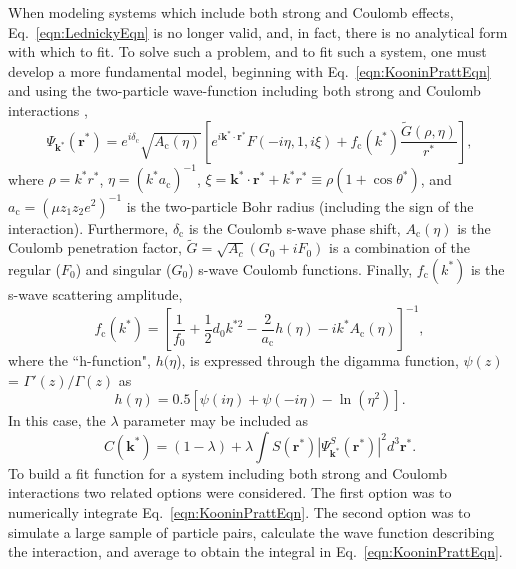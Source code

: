\documentclass[ALICE,manyauthors]{cernphprep}
\begin{document}
When modeling systems which include both strong and Coulomb effects, Eq.\ \ref{eqn:LednickyEqn} is no longer valid, and, in fact, there is no analytical form with which to fit.
To solve such a problem, and to fit such a system, one must develop a more fundamental model, beginning with Eq.\ \ref{eqn:KooninPrattEqn} and using the two-particle wave-function including both strong and Coulomb interactions \cite{Lednicky:2005tb},
\begin{equation}
 \Psi_{\mathbf{k^{*}}}(\mathbf{r^{*}}) = e^{i\delta_{\mathrm{c}}}\sqrt{A_{\mathrm{c}}(\eta)}[e^{i\mathbf{k^{*}} \cdot \mathbf{r^{*}}}F(-i\eta,1,i\xi) + f_{\mathrm{c}}(k^{*})\frac{\tilde{G}(\rho,\eta)}{r^{*}}],
\label{eqn:CoulombWaveFcn}
\end{equation}
where $\rho = k^{*}r^{*}$, $\eta = (k^{*}a_{\mathrm{c}})^{-1}$, $\xi = \mathbf{k^{*}} \cdot \mathbf{r^{*}} + k^{*}r^{*} \equiv \rho(1+\cos\theta^{*})$, and $a_{\mathrm{c}} = (\mu z_{1}z_{2}e^{2})^{-1}$ is the two-particle Bohr radius (including the sign of the interaction).  
Furthermore, $\delta_{\mathrm{c}}$ is the Coulomb s-wave phase shift, $A_{\mathrm{c}}(\eta)$ is the Coulomb penetration factor, $\tilde{G} = \sqrt{A_{c}}(G_{0} + iF_{0})$ is a combination of the regular ($F_{0}$) and singular ($G_{0}$) s-wave Coulomb functions.  
Finally, $f_{\mathrm{c}}(k^{*})$ is the s-wave scattering amplitude,
\begin{equation}
 f_{\mathrm{c}}(k^{*}) = \left[\frac{1}{f_{0}} + \frac{1}{2}d_{0}k^{*2} - \frac{2}{a_{\mathrm{c}}}h(\eta) - ik^{*}A_{\mathrm{c}}(\eta)\right]^{-1},
\label{eqn:CoulombScattAmp}
\end{equation}
where the ``h-function", $h(\eta$), is expressed through the digamma function, $\psi(z)$ = $\Gamma'(z)/\Gamma(z)$ as
\begin{equation}
 h(\eta) = 0.5[\psi(i\eta) + \psi(-i\eta) - \ln(\eta^{2})].
\label{eqn:LednickyHFunction}
\end{equation} 
In this case, the $\lambda$ parameter may be included as
\begin{equation}
 C(\mathbf{k^{*}}) = (1 - \lambda) + \lambda\int S(\mathbf{r^{*}})|\Psi^{S}_{\mathbf{k^{*}}}(\mathbf{r^{*}})|^{2}d^{3}\mathbf{r^{*}}.
\label{eqn:GenCfEqnwLambda}
\end{equation}
To build a fit function for a system including both strong and Coulomb interactions two related options were considered. 
The first option was to numerically integrate Eq.\ \ref{eqn:KooninPrattEqn}.  
The second option was to simulate a large sample of particle pairs, calculate the wave function describing the interaction, and average to obtain the integral in Eq.\ \ref{eqn:KooninPrattEqn}. 
\end{document}
